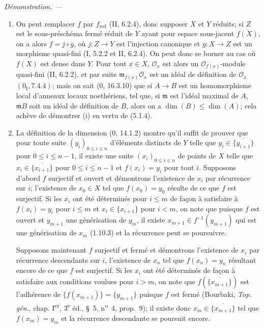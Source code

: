 \documentclass[10pt,oneside]{book}
\newcommand{\oldpage}[2][]{%
  \setcounter{footnote}{0}%
  \marginpar{\scriptsize\textbf{#1}~|~#2}\ignorespaces}
\newenvironment{proof}{%
  \par\medskip\noindent\textit{Démonstration. ---\ }}{\par}
\begin{document}
\begin{proof}
\begin{enumerate}
\item[(i)] On peut remplacer $f$ par $f_{\mathrm{red}}$ (II, 6.2.4), donc
supposer $X$ et $Y$ réduits; si $Z$ est le sous-préschéma fermé réduit de $Y$
ayant pour espace sous-jacent $\overline{f(X)}$, on a alors $f=j\circ g$, où
$j:Z\to Y$ est l'injection canonique et $g:X\to Z$ est un morphisme
quasi-fini (I, 5.2.2 et II, 6.2.4). On peut donc se borner au cas où $f(X)$
est dense dans $Y$. Pour tout $x\in X$, $\mathcal O_x$ est alors un
$\mathcal O_{f(x)}$-module quasi-fini (II, 6.2.2), et par suite
$\mathfrak m_{f(x)}\mathcal O_x$ est un idéal de définition de $\mathcal O_x$
$(0_{\mathrm I},7.4.4)$; mais on sait (0, 16.3.10) que si $A\to B$ est un
homomorphisme local d'anneaux locaux noethériens, tel que, si $\mathfrak m$
est l'idéal maximal de $A$, $\mathfrak mB$ soit un idéal de définition de
$B$, alors on a $\dim(B)\leq\dim(A)$; cela achève de démontrer (i) en vertu
de (5.1.4).

\item[(ii)] La définition de la dimension (0, 14.1.2) montre qu'il suffit de
prouver que pour toute suite $(y_i)_{0\leq i\leq n}$ d'éléments distincts de
$Y$ telle que $y_i\in\overline{\{y_{i+1}\}}$ pour $0\leq i\leq n-1$, il
existe une suite $(x_i)_{0\leq i\leq n}$ de points de $X$ telle que
$x_i\in\overline{\{x_{i+1}\}}$ pour $0\leq i\leq n-1$ et $f(x_i)=y_i$
pour tout $i$. Supposons d'abord $f$ surjectif et ouvert et démontrons
l'existence de $x_i$ par récurrence sur $i$; l'existence de $x_0\in X$ tel
que $f(x_0)=y_0$ résulte de ce que $f$ est surjectif. Si les $x_i$ ont été
déterminés pour $i\leq m$ de façon à satisfaire à $f(x_i)=y_i$ pour
$i\leq m$ et $x_i\in\overline{\{x_{i+1}\}}$ pour $i<m$, on note que puisque
$f$ est ouvert et $y_{m+1}$ une générisation de $y_m$, il existe
$x_{m+1}\in f^{-1}(y_{m+1})$ qui est une générisation de $x_m$ (1.10.3) et
la récurrence peut se poursuivre.

\oldpage[IV-2]{94}

Supposons maintenant $f$ surjectif et fermé et démontrons l'existence de
$x_i$ par récurrence descendante sur $i$, l'existence de $x_n$ tel que
$f(x_n)=y_n$ résultant encore de ce que $f$ est surjectif. Si les $x_i$ ont
été déterminés de façon à satisfaire aux conditions voulues pour $i>m$, on
note que $f(\overline{\{x_{m+1}\}})$ est l'adhérence de
$\{f(x_{m+1})\}=\{y_{m+1}\}$ puisque $f$ est fermé (Bourbaki,
\emph{Top. gén.}, chap. I\textsuperscript{er}, 3\textsuperscript{e} éd.,
\S~5, n\textsuperscript{o}~4, prop.~9); il existe donc
$x_m\in\overline{\{x_{m+1}\}}$ tel que $f(x_m)=y_m$ et la récurrence
descendante se poursuit encore.
\end{enumerate}
\end{proof}
\end{document}
